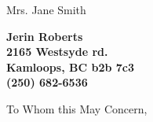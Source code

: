 \documentclass[11pt]{letter} %
\begin{document}

\begin{letter}{Mrs. Jane Smith \\



\begin{center}
\large\bf Jerin Roberts \\ %
2165 Westsyde rd. \\ Kamloops, BC b2b 7c3 \\ (250) 682-6536 %
\end{center} 
\vfill

\signature{Jerin Roberts} %


\opening{To Whom this May Concern,} 

}
\end{letter}
\end{document}
